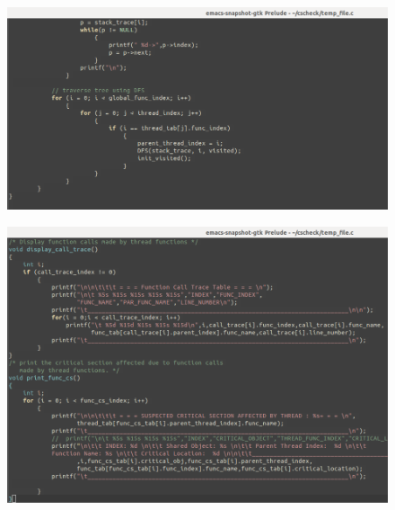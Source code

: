 \begin{figure}[H]
\centering
\includegraphics[scale=0.4]{Snaps/util_11.png}
\label{<<Label>>}
\end{figure}
\begin{figure}[H]
\centering
\includegraphics[scale=0.4]{Snaps/util_12.png}
\label{<<Label>>}
\end{figure}

